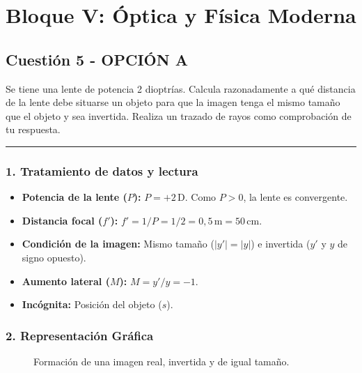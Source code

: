 \section{Bloque V: Óptica y Física Moderna}
\label{sec:optmod_2019_jun_ord}

\subsection{Cuestión 5 - OPCIÓN A}
\label{subsec:5A_2019_jun_ord}
\begin{cajaenunciado}
Se tiene una lente de potencia 2 dioptrías. Calcula razonadamente a qué distancia de la lente debe situarse un objeto para que la imagen tenga el mismo tamaño que el objeto y sea invertida. Realiza un trazado de rayos como comprobación de tu respuesta.
\end{cajaenunciado}
\hrule
\subsubsection*{1. Tratamiento de datos y lectura}
\begin{itemize}
    \item \textbf{Potencia de la lente ($P$):} $P = +2\,\text{D}$. Como $P>0$, la lente es convergente.
    \item \textbf{Distancia focal ($f'$):} $f' = 1/P = 1/2 = 0,5\,\text{m} = 50\,\text{cm}$.
    \item \textbf{Condición de la imagen:} Mismo tamaño ($|y'|=|y|$) e invertida ($y'$ y $y$ de signo opuesto).
    \item \textbf{Aumento lateral ($M$):} $M = y'/y = -1$.
    \item \textbf{Incógnita:} Posición del objeto ($s$).
\end{itemize}
\subsubsection*{2. Representación Gráfica}
\begin{figure}[H]
    \centering
    \caption{Formación de una imagen real, invertida y de igual tamaño.}
\end{figure}
